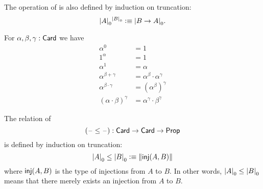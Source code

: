 \documentclass[hott-all.tex]{subfiles}
\begin{document}
% 
\begin{defn}
  The operation of  is also defined by induction on truncation:
  \[ \mathopen{}\left|A\right|_{0}^{}\mathclose{}^{\mathopen{}\left|B\right|_{0}^{}\mathclose{}} \vcentcolon\equiv \mathopen{}\left|B\to A\right|_{0}^{}\mathclose{}. \]
\end{defn}
% 
\begin{lem}
  For $\alpha,\beta,\gamma:\mathsf{Card}$ we have
  \begin{align*}
    \alpha^0 &= 1\\
    1^\alpha &= 1\\
    \alpha^1 &= \alpha\\
    \alpha^{\beta+\gamma} &= \alpha^\beta \cdot \alpha^\gamma\\
    \alpha^{\beta\cdot \gamma} &= (\alpha^{\beta})^\gamma\\
    (\alpha\cdot\beta)^\gamma &= \alpha^\gamma \cdot \beta^\gamma
  \end{align*}
\end{lem}
% 
\begin{defn}
  The relation of 
  \[ (\mathord{\hspace{1pt}\text{--}\hspace{1pt}}\le\mathord{\hspace{1pt}\text{--}\hspace{1pt}}) : \mathsf{Card}\to\mathsf{Card}\to\mathsf{Prop} \]
  is defined by induction on truncation:
  \[ \mathopen{}\left|A\right|_{0}^{}\mathclose{} \le \mathopen{}\left|B\right|_{0}^{}\mathclose{} \vcentcolon\equiv \mathopen{}\left\Vert \mathsf{inj}(A,B)\right\Vert_{}\mathclose{} \]
  where $\mathsf{inj}(A,B)$ is the type of injections from $A$ to $B$.
  In other words, $\mathopen{}\left|A\right|_{0}^{}\mathclose{} \le \mathopen{}\left|B\right|_{0}^{}\mathclose{}$ means that there merely exists an injection from $A$ to $B$.
\end{defn}
\end{document}
